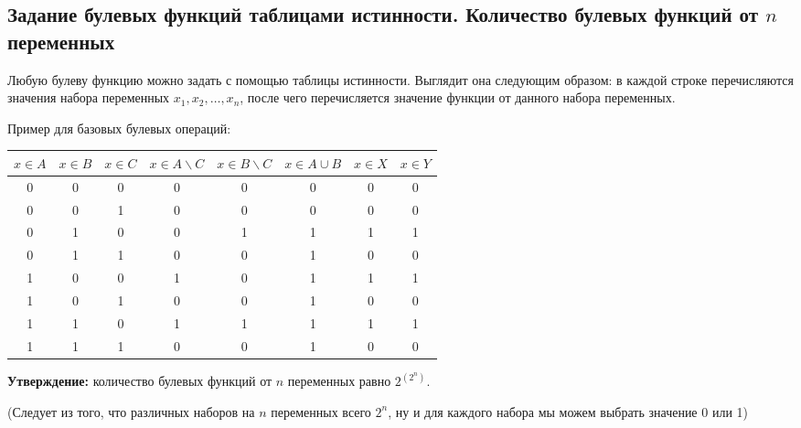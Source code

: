 \subsection{Задание булевых функций таблицами истинности. Количество булевых функций от $n$ переменных}

Любую булеву функцию можно задать с помощью таблицы истинности. Выглядит она следующим образом: в каждой строке перечисляются значения набора переменных $x_1, x_2, \ldots, x_n$, после чего перечисляется значение функции от данного набора переменных.

Пример для базовых булевых операций:

   \begin{tabular}{|c|c|c|c|c|c|c|c|}
       \hline
       $x \in A$ & $x \in B$ & $x \in C$ & $x \in A \backslash C$ & $x \in B \backslash C$ & $x \in A \cup B$ & $x \in X$ & $x \in Y$ \\
       \hline
       0 & 0 & 0 & 0 & 0 & 0 & 0 & 0 \\
       \hline
       0 & 0 & 1 & 0 & 0 & 0 & 0 & 0 \\
       \hline
       0 & 1 & 0 & 0 & 1 & 1 & 1 & 1 \\
       \hline
       0 & 1 & 1 & 0 & 0 & 1 & 0 & 0 \\
       \hline
       1 & 0 & 0 & 1 & 0 & 1 & 1 & 1 \\
       \hline
       1 & 0 & 1 & 0 & 0 & 1 & 0 & 0 \\
       \hline
       1 & 1 & 0 & 1 & 1 & 1 & 1 & 1 \\
       \hline
       1 & 1 & 1 & 0 & 0 & 1 & 0 & 0 \\
       \hline
   \end{tabular}

\textbf{Утверждение:} количество булевых функций от $n$ переменных равно $2^(2^n)$.

(Следует из того, что различных наборов на $n$ переменных всего $2^n$, ну и для каждого набора мы можем выбрать значение 0 или 1)
